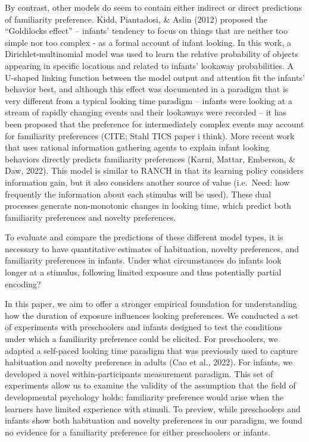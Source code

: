 \documentclass[10pt, letterpaper]{article}
\begin{document}
By contrast, other models do seem to contain either indirect or direct
predictions of familiarity preference. Kidd, Piantadosi, \& Aslin (2012)
proposed the ``Goldilocks effect'' -- infants' tendency to focus on
things that are neither too simple nor too complex - as a formal account
of infant looking. In this work, a Dirichlet-multinomial model was used
to learn the relative probability of objects appearing in specific
locations and related to infants' lookaway probabilities. A U-shaped
linking function between the model output and attention fit the infants'
behavior best, and although this effect was documented in a paradigm
that is very different from a typical looking time paradigm -- infants
were looking at a stream of rapidly changing events and their lookaways
were recorded -- it has been proposed that the preference for
intermediately complex events may account for familiarity preferences
(CITE; Stahl TICS paper i think). More recent work that uses rational
information gathering agents to explain infant looking behaviors
directly predicts familiarity preferences (Karni, Mattar, Emberson, \&
Daw, 2022). This model is similar to RANCH in that its learning policy
considers information gain, but it also considers another source of
value (i.e.~Need: how frequently the information about each stimulus
will be used). These dual processes generate non-monotonic changes in
looking time, which predict both familiarity preferences and novelty
preferences.

To evaluate and compare the predictions of these different model types,
it is necessary to have quantitative estimates of habituation, novelty
preferences, and familiarity preferences in infants. Under what
circumstances do infants look longer at a stimulus, following limited
exposure and thus potentially partial encoding?

In this paper, we aim to offer a stronger empirical foundation for
understanding how the duration of exposure influences looking
preferences. We conducted a set of experiments with preschoolers and
infants designed to test the conditions under which a familiarity
preference could be elicited. For preschoolers, we adapted a self-paced
looking time paradigm that was previously used to capture habituation
and novelty preference in adults (Cao et al., 2022). For infants, we
developed a novel within-participants measurement paradigm. This set of
experiments allow us to examine the validity of the assumption that the
field of developmental psychology holds: familiarity preference would
arise when the learners have limited experience with stimuli. To
preview, while preschoolers and infants show both habituation and
novelty preferences in our paradigm, we found no evidence for a
familiarity preference for either preschoolers or infants.
\end{document}
